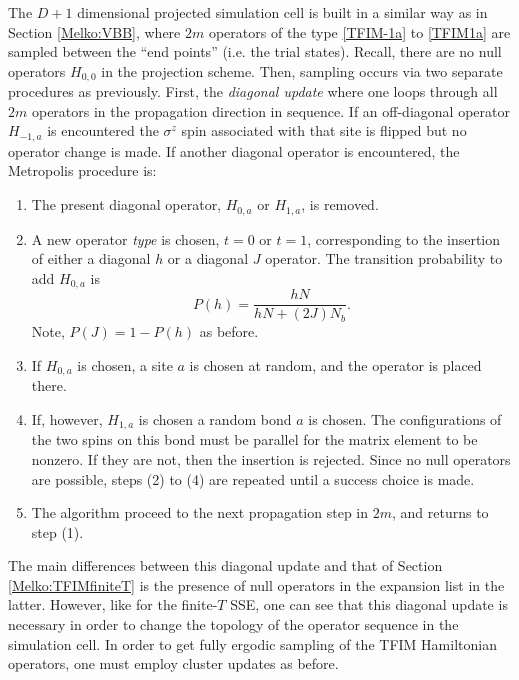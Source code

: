 \documentclass[vecphys]{svmult}
\begin{document}
The $D+1$ dimensional projected simulation cell is built in a similar way as in Section \ref{Melko:VBB}, where $2m$ operators of the type \ref{TFIM-1a} to \ref{TFIM1a}  are sampled between the ``end points'' (i.e. the trial states).  Recall, there are no null operators $H_{0,0}$ in the projection scheme.  Then, sampling occurs via two separate procedures as previously.  First, the {\em diagonal update} where one loops through all $2m$ operators in the propagation direction in sequence. If an off-diagonal operator $H_{-1,a}$ is encountered the $\sigma^z$ spin associated with that site is flipped but no operator change is made.  If another diagonal operator is encountered, the Metropolis procedure is:
\begin{enumerate}
\item The present diagonal operator,  $H_{0,a}$ or  $H_{1,a}$, is removed. 
\item A new operator {\em type} is chosen, $t=0$ or $t=1$, corresponding to the insertion of either a diagonal $h$ or a diagonal $J$ operator.  The transition probability to add $H_{0,a}$ is 
\begin{equation}
P(h) = \frac{h N}{hN + (2J)N_b}.
\end{equation}
Note, $P(J) = 1- P(h)$ as before.  %
\item If $H_{0,a}$ is chosen, a site $a$ is chosen at random, and the operator is placed there.
\item If, however, $H_{1,a}$ is chosen a random {\rm bond} $a$ is chosen.  The configurations of the two spins on this bond must be parallel for the matrix element to be nonzero.  If they are not, then the insertion is rejected.   Since no null operators are possible, steps (2) to (4) are repeated until a success choice is made.
\item The algorithm proceed to the next propagation step in $2m$, and returns to step (1).
\end{enumerate}
The main differences between this diagonal update and that of Section \ref{Melko:TFIMfiniteT} is the presence of null operators in the expansion list in the latter.  However, like for the finite-$T$ SSE, one can see that this diagonal update is necessary in order to change the topology of the operator sequence in the simulation cell.  In order to get fully ergodic sampling of the TFIM Hamiltonian operators, one must employ cluster updates as before.
\end{document}
